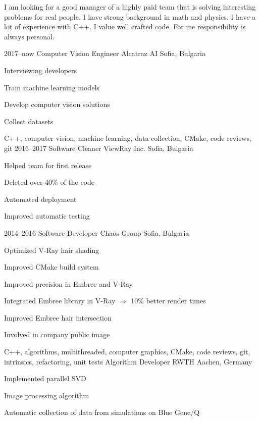 I am looking for a good manager of a highly paid team that is solving
interesting problems for real people. I have strong background in math
and physics. I have a lot of experience with C++. I value well
crafted code. For me responsibility is always personal.

\myjobb
{2017--now}
{Computer Vision Engineer}
{Alcatraz AI}
{Sofia, Bulgaria}
{
\item Interviewing developers
\item Train machine learning models
}
{
\item Develop computer vision solutions
\item Collect datasets
}
{C++, computer vision, machine learning, data collection, CMake, code reviews, git}
\myjoba
{2016--2017}
{Software Cleaner}
{ViewRay Inc.}
{Sofia, Bulgaria}
{
\item Helped team for first release 
\item Deleted over 40\% of the code 
}
{
\item Automated deployment  
\item Improved automatic testing 
}
{}
\myjobb
{2014--2016}
{Software Developer}
{Chaos Group}
{Sofia, Bulgaria}
{
\item Optimized V-Ray hair shading
\item Improved CMake build system 
\item Improved precision in Embree and V-Ray
}
{
\item Integrated Embree library in V-Ray $\Rightarrow$ 10\% better render times 
\item Improved Embree hair intersection 
\item Involved in company public image
}
{C++, algorithms, multithreaded, computer graphics, CMake, code reviews, git, intrinsics, refactoring, unit tests}
{Algorithm Developer}
{RWTH}
{Aachen, Germany}
{
 \item Implemented parallel SVD
 \item Image processing algorithm
}
{
\item Automatic collection of data from simulations on Blue Gene/Q
}
